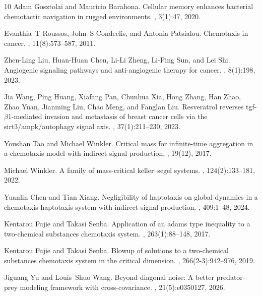 \documentclass[pdflatex,sn-mathphys-num]{sn-jnl}%
\theoremstyle{thmstyleone}
\theoremstyle{thmstyletwo}
\theoremstyle{thmstylethree}
\begin{document}
\begin{thebibliography}{10}
Adam Gosztolai and Mauricio Barahona.
\newblock Cellular memory enhances bacterial chemotactic navigation in rugged environments.
, 3(1):47, 2020.

Evanthia~T Roussos, John~S Condeelis, and Antonia Patsialou.
\newblock Chemotaxis in cancer.
, 11(8):573--587, 2011.

Zhen-Ling Liu, Huan-Huan Chen, Li-Li Zheng, Li-Ping Sun, and Lei Shi.
\newblock Angiogenic signaling pathways and anti-angiogenic therapy for cancer.
, 8(1):198, 2023.

Jia Wang, Ping Huang, Xiafang Pan, Chunhua Xia, Hong Zhang, Han Zhao, Zhao Yuan, Jianming Liu, Chao Meng, and Fanglan Liu.
\newblock Resveratrol reverses tgf-$\beta$1-mediated invasion and metastasis of breast cancer cells via the sirt3/ampk/autophagy signal axis.
, 37(1):211--230, 2023.

Youshan Tao and Michael Winkler.
\newblock Critical mass for infinite-time aggregation in a chemotaxis model with indirect signal production.
, 19(12), 2017.

Michael Winkler.
\newblock A family of mass-critical keller--segel systems.
, 124(2):133--181, 2022.

Yuanlin Chen and Tian Xiang.
\newblock Negligibility of haptotaxis on global dynamics in a chemotaxis-haptotaxis system with indirect signal production.
, 409:1--48, 2024.

Kentarou Fujie and Takasi Senba.
\newblock Application of an adams type inequality to a two-chemical substances chemotaxis system.
, 263(1):88--148, 2017.

Kentarou Fujie and Takasi Senba.
\newblock Blowup of solutions to a two-chemical substances chemotaxis system in the critical dimension.
, 266(2-3):942--976, 2019.

Jiguang Yu and Louis~Shuo Wang.
\newblock Beyond diagonal noise: A better predator-prey modeling framework with cross-covariance.
, 21(5):e0350127, 2026.


\end{thebibliography}
\end{document}
